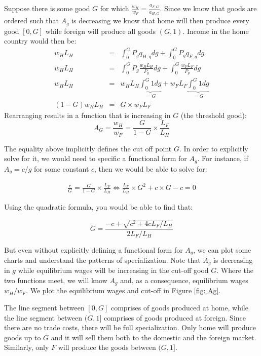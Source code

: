 \documentclass[11pt,letterpaper]{article}
\begin{document}
Suppose there is some good $G$ for which $\frac{w_H}{w_F} = \frac{a_{F,G}}{a_{H,G}}$. Since we know that goods are ordered such that $A_g$ is decreasing we know that home will then produce every good $[0,G]$ while foreign will produce all goods $(G,1)$. Income in the home country would then be:
{\scriptsize
\begin{eqnarray*}
   w_H L_H &=& \int_0^G P_g q_{H,g} dg + \int_0^G P_g q_{F,g} dg    \\
   w_H L_H &=& \int_0^G P_g \frac{w_H L_H}{ P_g} dg + \int_0^G\frac{w_F L_F}{ P_g} dg    \\
   w_H L_H &=& w_H L_H \underbrace{\int_0^G 1 dg}_{=G} +w_F L_F \underbrace{\int_0^G 1 dg}_{=G}    \\
   (1-G) w_H L_H &=&  G \times w_F L_F    
\end{eqnarray*}
}
\normalsize
\noindent Rearranging results in a function that is increasing in $G$ (the threshold good):\\
\begin{equation*}
    A_G= \frac{w_H}{w_F} =  \frac{G}{1-G} \times \frac{ L_F }{L_H}
\end{equation*}

The equality above implicitly defines the cut off point $G$. In order to explicitly solve for it, we would need to specific a functional form for $A_g$. For instance, if $A_g = c / g$ for some constant $c$, then we would be able to solve for:

\begin{eqnarray*}
    \frac{c}{G} = \frac{G}{1-G} \times \frac{ L_F }{L_H} \iff \frac{ L_F }{L_H} \times G^2  + c \times G -c =0 
\end{eqnarray*}

Using the quadratic formula, you would be able to find that:

\begin{equation*}
    G = \frac{-c + \sqrt{c^2 + 4 c L_F / L_H}}{2  L_F / L_H }
\end{equation*}

But even without explicitly defining a functional form for $A_g$, we can plot some charts and understand the patterns of specialization. Note that $A_g$ is decreasing in $g$ while equilibrium wages will be increasing in the cut-off good $G$. Where the two functions meet, we will know $A_g$ and, as a consequence, equilibrium wages $w_H/w_F$. We plot the equilibrium wages and cut-off in Figure \ref{fig: Ag}.

The line segment between $[0,G]$ comprises of goods produced at home, while the line segment between $(G,1]$ comprises of goods produced at foreign. Since there are no trade costs, there will be full specialization. Only home will produce goods up to $G$ and it will sell them both to the domestic and the foreign market. Similarly, only $F$ will produce the goods between $(G,1]$.
\end{document}

